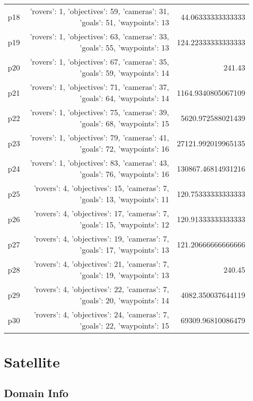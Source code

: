 \documentclass{article}
\begin{document}
\begin{center}
\begin{tabular}{r|r|r}
  p18&{'rovers': 1, 'objectives': 59, 'cameras': 31, 'goals': 51, 'waypoints': 13}&44.06333333333333\\
  p19&{'rovers': 1, 'objectives': 63, 'cameras': 33, 'goals': 55, 'waypoints': 13}&124.22333333333333\\
  p20&{'rovers': 1, 'objectives': 67, 'cameras': 35, 'goals': 59, 'waypoints': 14}&241.43\\
  p21&{'rovers': 1, 'objectives': 71, 'cameras': 37, 'goals': 64, 'waypoints': 14}&1164.9340805067109\\
  p22&{'rovers': 1, 'objectives': 75, 'cameras': 39, 'goals': 68, 'waypoints': 15}&5620.972588021439\\
  p23&{'rovers': 1, 'objectives': 79, 'cameras': 41, 'goals': 72, 'waypoints': 16}&27121.992019965135\\
  p24&{'rovers': 1, 'objectives': 83, 'cameras': 43, 'goals': 76, 'waypoints': 16}&130867.46814931216\\
  p25&{'rovers': 4, 'objectives': 15, 'cameras': 7, 'goals': 13, 'waypoints': 11}&120.75333333333333\\
  p26&{'rovers': 4, 'objectives': 17, 'cameras': 7, 'goals': 15, 'waypoints': 12}&120.91333333333333\\
  p27&{'rovers': 4, 'objectives': 19, 'cameras': 7, 'goals': 17, 'waypoints': 13}&121.20666666666666\\
  p28&{'rovers': 4, 'objectives': 21, 'cameras': 7, 'goals': 19, 'waypoints': 13}&240.45\\
  p29&{'rovers': 4, 'objectives': 22, 'cameras': 7, 'goals': 20, 'waypoints': 14}&4082.350037644119\\
  p30&{'rovers': 4, 'objectives': 24, 'cameras': 7, 'goals': 22, 'waypoints': 15}&69309.96810086479
                            \end{tabular}
                            \end{center}
                    
                            \newpage \section{Satellite}
                    \subsection*{Domain Info}
\end{document}
